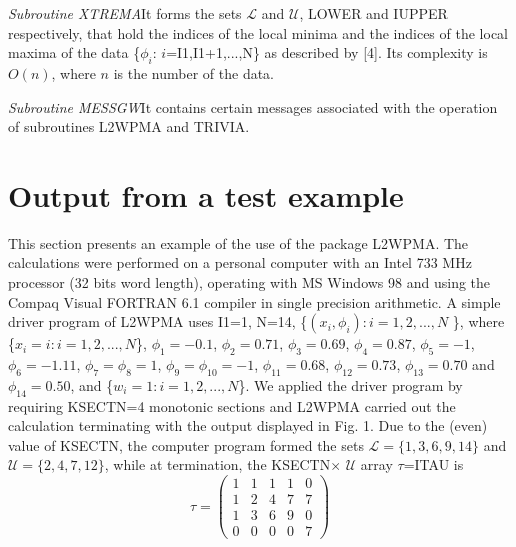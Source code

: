 \documentclass[acmtoms]{acmtrans2m}
\begin{document}
\textit{Subroutine XTREMA\qquad }It forms the sets $\mathscr{L}$ and $%
\mathscr{U}$, LOWER and IUPPER respectively, that hold the indices of the
local minima and the indices of the local maxima of the data \{$\phi _{i}$: $%
i$=I1,I1+1,...,N\} as described by [4]. Its complexity is $O(n)$, where $n$
is the number of the data.

\textit{Subroutine MESSGW\qquad }It contains certain messages associated
with the operation of subroutines L2WPMA and TRIVIA.

\section{Output from a test example}

This section presents an example of the use of the package L2WPMA. The
calculations were performed on a personal computer with an Intel 733 MHz
processor (32 bits word length), operating with MS Windows 98 and using the
Compaq Visual FORTRAN 6.1 compiler in single precision arithmetic. A simple
driver program of L2WPMA uses I1=1, N=14, \{$(x_{i},\phi _{i}):i=1,2,...,N$%
\}, where \{$x_{i}=i:i=1,2,...,N$\}, $\phi _{1}=-0.1$, $\phi _{2}=0.71$, $%
\phi _{3}=0.69$, $\phi _{4}=0.87$, $\phi _{5}=-1$, $\phi _{6}=-1.11$, $\phi
_{7}=\phi _{8}=1$, $\phi _{9}=\phi _{10}=-1$, $\phi _{11}=0.68$, $\phi
_{12}=0.73$, $\phi _{13}=0.70$ and $\phi _{14}=0.50$, and \{$%
w_{i}=1:i=1,2,...,N$\}. We applied the driver program by requiring KSECTN=4
monotonic sections and L2WPMA carried out the calculation terminating with
the output displayed in Fig. 1. Due to the (even) value of KSECTN, the
computer program formed the sets $\mathscr{L}=\{1,3,6,9,14\}$ and $%
\mathscr{U}=\{2,4,7,12\}$, while at termination, the KSECTN$\times $%
\TEXTsymbol{\vert}$\mathscr{U}$\TEXTsymbol{\vert} array $\tau $=ITAU is 
\begin{equation}
\tau =\left( 
\begin{array}{lllll}
1 & 1 & 1 & 1 & 0 \\ 
1 & 2 & 4 & 7 & 7 \\ 
1 & 3 & 6 & 9 & 0 \\ 
0 & 0 & 0 & 0 & 7
\end{array}
\right)  \label{4.1}
\end{equation}
\end{document}
